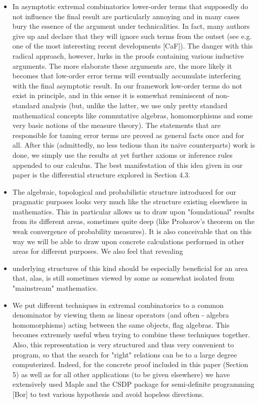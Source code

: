 \documentclass[10pt]{article}
\begin{document}
\begin{itemize}
  \item[-] In asymptotic extremal combinatorics lower-order terms that supposedly do not influence the final result are particularly annoying and in many cases bury the essence of the argument under technicalities. In fact, many authors give up and declare that they will ignore such terms from the outset (see e.g. one of the most interesting recent developments [CaF]). The danger with this radical approach, however, lurks in the proofs containing various inductive arguments. The more elaborate these arguments are, the more likely it becomes that low-order error terms will eventually accumulate interfering with the final asymptotic result. In our framework low-order terms do not exist in principle, and in this sense it is somewhat reminiscent of non-standard analysis (but, unlike the latter, we use only pretty standard mathematical concepts like commutative algebras, homomorphisms and some very basic notions of the measure theory). The statements that are responsible for taming error terms are proved as general facts once and for all. After this (admittedly, no less tedious than its naive counterparts) work is done, we simply use the results at yet further axioms or inference rules appended to our calculus. The best manifestation of this idea given in our paper is the differential structure explored in Section 4.3.
  \item[-] The algebraic, topological and probabilistic structure introduced for our pragmatic purposes looks very much like the structure existing elsewhere in mathematics. This in particular allows us to draw upon "foundational" results from its different areas, sometimes quite deep (like Prohorov's theorem on the weak convergence of probability measures). It is also conceivable that on this way we will be able to draw upon concrete calculations performed in other areas for different purposes. We also feel that revealing
\end{itemize}

\begin{itemize}
  \item[] underlying structures of this kind should be especially beneficial for an area that, alas, is still sometimes viewed by some as somewhat isolated from "mainstream" mathematics.
  \item[-] We put different techniques in extremal combinatorics to a common denominator by viewing them as linear operators (and often - algebra homomorphisms) acting between the same objects, flag algebras. This becomes extremely useful when trying to combine these techniques together. Also, this representation is very structured and thus very convenient to program, so that the search for "right" relations can be to a large degree computerized. Indeed, for the concrete proof included in this paper (Section 5) as well as for all other applications (to be given elsewhere) we have extensively used Maple and the CSDP package for semi-definite programming [Bor] to test various hypothesis and avoid hopeless directions.
\end{itemize}
\end{document}

